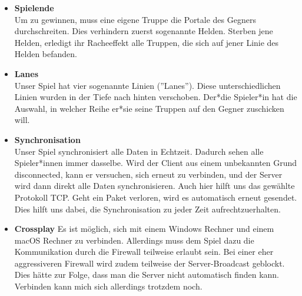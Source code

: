 \begin{itemize}
    \item \textbf{Spielende} \\
        Um zu gewinnen, muss eine eigene Truppe die Portale des Gegners durchschreiten. Dies verhindern zuerst sogenannte Helden. Sterben jene Helden, erledigt ihr Racheeffekt alle
        Truppen, die sich auf jener Linie des Helden befanden.
    \item \textbf{Lanes} \\
        Unser Spiel hat vier sogenannte Linien (''Lanes''). Diese unterschiedlichen Linien wurden in der Tiefe nach hinten verschoben. Der*die Spieler*in hat die Auswahl, in welcher Reihe er*sie seine Truppen auf den Gegner zuschicken will.
    \item \textbf{Synchronisation} \\
        Unser Spiel synchronisiert alle Daten in Echtzeit. Dadurch sehen alle Spieler*innen immer dasselbe. Wird der Client aus einem unbekannten Grund disconnected, kann er versuchen,
        sich erneut zu verbinden, und der Server wird dann direkt alle Daten synchronisieren. Auch hier hilft uns das gewählte Protokoll TCP. Geht ein Paket verloren, wird es automatisch
        erneut gesendet. Dies hilft uns dabei, die Synchronisation zu jeder Zeit aufrechtzuerhalten.
    \item \textbf{Crossplay}
        Es ist möglich, sich mit einem Windows Rechner und einem macOS Rechner zu verbinden. Allerdings muss dem Spiel dazu die Kommunikation durch die Firewall teilweise erlaubt sein.
        Bei einer eher aggressiveren Firewall wird zudem teilweise der Server-Broadcast geblockt. Dies hätte zur Folge, dass man die Server nicht automatisch finden kann. 
        Verbinden kann mich sich allerdings trotzdem noch.   
\end{itemize}


